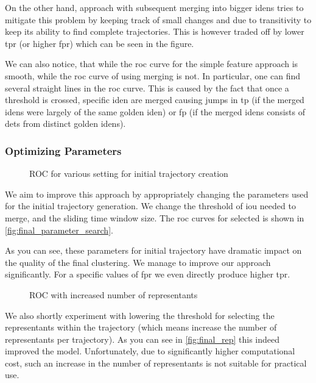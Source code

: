 On the other hand, approach with subsequent merging into bigger \glspl{iden} tries to mitigate this problem by keeping track of small changes and due to transitivity to keep its ability to find complete trajectories. This is however traded off by lower \gls{tpr} (or higher \gls{fpr}) which can be seen in the figure.

We can also notice, that while the \gls{roc} curve for the simple feature approach is smooth, while the \gls{roc} curve of using merging is not. In particular, one can find several straight lines in the \gls{roc} curve. This is caused by the fact that once a threshold is crossed, specific \gls{iden} are merged causing jumps in \gls{tp} (if the merged \glspl{iden} were largely of the same golden \gls{iden}) or \gls{fp} (if the merged \glspl{iden} consists of \glspl{det} from distinct golden \glspl{iden}).

\subsubsection{Optimizing Parameters}

\begin{figure}
    \centering
    \def\svgwidth{\columnwidth}
    {}
    \caption{ROC for various setting for initial trajectory creation}
    \label{fig:final_parameter_search}
\end{figure}

We aim to improve this approach by appropriately changing the parameters used for the initial trajectory generation. We change the threshold of \gls{iou} needed to merge, and the sliding time window size. The \gls{roc} curves for selected is shown in \autoref{fig:final_parameter_search}.

As you can see, these parameters for initial trajectory have dramatic impact on the quality of the final clustering. We manage to improve our approach significantly. For a specific values of \gls{fpr} we even directly produce higher \gls{tpr}.

\begin{figure}
    \centering
    \def\svgwidth{\columnwidth}
    {}
    \caption{ROC with increased number of representants}
    \label{fig:final_rep}
\end{figure}

We also shortly experiment with lowering the threshold for selecting the representants within the trajectory (which means increase the number of representants per trajectory). As you can see in \autoref{fig:final_rep} this indeed improved the model. Unfortunately, due to significantly higher computational cost, such an increase in the number of representants is not suitable for practical use.

